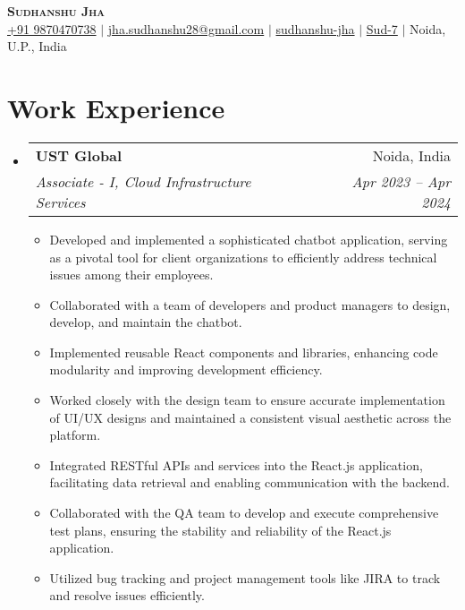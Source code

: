 \documentclass[letterpaper,12pt]{article}
\makeatletter
\newcommand{\resumeItem}[1]{
  \item\small{
    {#1 \vspace{-2pt}}
  }
}
\newcommand{\resumeSubheading}[4]{
  \vspace{-2pt}\item
    \begin{tabular*}{0.97\textwidth}[t]{l@{\extracolsep{\fill}}r}
      \textbf{#1} & #2 \\
      \textit{\small#3} & \textit{\small #4} \\
    \end{tabular*}\vspace{-7pt}
}
\newcommand{\resumeSubHeadingListStart}{\begin{itemize}[leftmargin=0.15in, label={}]}
\newcommand{\resumeSubHeadingListEnd}{\end{itemize}}
\newcommand{\resumeItemListStart}{\begin{itemize}}
\newcommand{\resumeItemListEnd}{\end{itemize}\vspace{-5pt}}
\makeatother
\begin{document}
\begin{center}
    \textbf{\Huge \scshape Sudhanshu Jha} \\ \vspace{3pt}
    \small
    \faMobile \hspace{.5pt} \href{tel:9870470738}{+91 9870470738}
    $|$
    \faAt \hspace{.5pt} \href{mailto:jha.sudhanshu28@gmail.com}{jha.sudhanshu28@gmail.com}
    $|$
    \faLinkedinSquare \hspace{.5pt} \href{https://www.linkedin.com/in/sudhanshu-jha28/}{sudhanshu-jha}
    $|$
    \faGithub \hspace{.5pt} \href{https://github.com/Sud-7}{Sud-7}
    $|$
    \faMapMarker \hspace{.5pt} Noida, U.P., India
\end{center}

\section{Work Experience}
  \vspace{3pt}
  \resumeSubHeadingListStart
    \resumeSubheading
      {UST Global}{Noida, India}
      {Associate - I, Cloud Infrastructure Services}{Apr 2023 -- Apr 2024}
        \resumeItemListStart
            \resumeItem{Developed and implemented a sophisticated chatbot application, serving as a pivotal tool for client organizations to efficiently address technical issues among their employees.}
            \resumeItem{Collaborated with a team of developers and product managers to design, develop, and maintain the chatbot.}
            \resumeItem{Implemented reusable React components and libraries, enhancing code modularity and improving development efficiency.}
            \resumeItem{Worked closely with the design team to ensure accurate implementation of UI/UX designs and maintained a consistent visual aesthetic across the platform.}
            \resumeItem{Integrated RESTful APIs and services into the React.js application, facilitating data retrieval and enabling communication with the backend.}
            \resumeItem{Collaborated with the QA team to develop and execute comprehensive test plans, ensuring the stability and reliability of the React.js application.}
            \resumeItem{Utilized bug tracking and project management tools like JIRA to track and resolve issues efficiently.}
        \resumeItemListEnd
  \resumeSubHeadingListEnd
\end{document}
